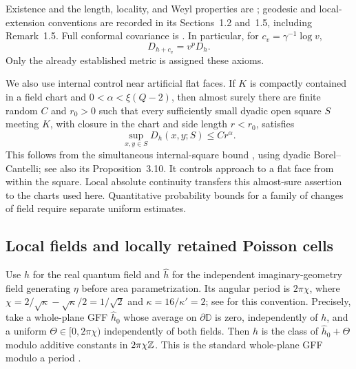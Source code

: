 Existence and the length, locality, and Weyl properties are
\cite[Theorems~1.1--1.2 and Section~1.2]{GwynneMillerMetric}; geodesic and
local-extension conventions are recorded in its Sections~1.2 and~1.5,
including Remark~1.5. Full conformal covariance is
\cite[Theorem~1.3]{GwynneMillerConformal}. In particular, for
$c_v=\gamma^{-1}\log v$,
\begin{equation}\label{tree:eq:reference_quantum_unit}
 D_{h+c_v}=v^pD_h.
\end{equation}
Only the already established metric is assigned these axioms.

We also use internal control near artificial flat faces. If
$K$ is compactly contained in a field chart and
$0<\alpha<\xi(Q-2)$, then almost surely there are finite random
$C$ and $r_0>0$ such that every sufficiently small dyadic open
square $S$ meeting $K$, with closure in the chart and side
length $r<r_0$, satisfies
\begin{equation}\label{tree:eq:internal_square_holder}
 \sup_{x,y\in S}D_h(x,y;S)\leq Cr^\alpha.
\end{equation}
This follows from the simultaneous internal-square bound
\cite[Lemma~3.20, Equation~(3.67)]{DFGPSWeakMetric}, using dyadic
Borel--Cantelli; see also its Proposition~3.10. It controls
approach to a flat face from within the square. Local absolute
continuity transfers this almost-sure assertion to the charts
used here. Quantitative probability bounds for a family of
changes of field require separate uniform estimates.

\subsection{Local fields and locally retained Poisson cells}

Use $h$ for the real quantum field and $\widehat h$ for the
independent imaginary-geometry field generating $\eta$ before
area parametrization. Its angular period is $2\pi\chi$, where
$\chi=2/\sqrt\kappa-\sqrt\kappa/2=1/\sqrt2$ and
$\kappa=16/\kappa'=2$; see
\cite[Section~2.1.3]{GwynneMillerSheffieldHarmonic} for this convention.
Precisely, take a whole-plane GFF $\widehat h_0$ whose average
on $\partial\mathbb D$ is zero, independently of $h$, and a
uniform $\Theta\in[0,2\pi\chi)$ independently of both fields.
Then $\widehat h$ is the class of $\widehat h_0+\Theta$ modulo
additive constants in $2\pi\chi\mathbb Z$. This is the standard
whole-plane GFF modulo a period
\cite[Section~2.2.1, p.~48]{MillerSheffieldIGIV}.

